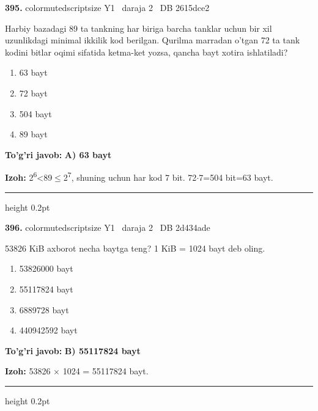 \documentclass[10pt,a4paper,oneside]{article}
\begin{document}
\noindent\textbf{\color{ink}395.}  {color{muted}scriptsize Y1 \textbullet\ daraja 2 \textbullet\ DB 2615dce2}
\par
Harbiy bazadagi 89 ta tankning har biriga barcha tanklar uchun bir xil uzunlikdagi minimal ikkilik kod berilgan. Qurilma marradan o'tgan 72 ta tank kodini bitlar oqimi sifatida ketma-ket yozsa, qancha bayt xotira ishlatiladi?
\begin{enumerate}[label=\Alph*),leftmargin=9mm]
\item 63 bayt
\item 72 bayt
\item 504 bayt
\item 89 bayt
\end{enumerate}
\begin{tcolorbox}[enhanced,breakable,colback=teal!4,colframe=teal!50!black,boxrule=0.5pt,arc=1.1mm,left=3mm,right=3mm,top=1.7mm,bottom=1.7mm,before skip=2mm,after skip=2mm]
\textbf{\color{teal}To'g'ri javob:} \textbf{A) 63 bayt}
\par\smallskip
\textbf{Izoh:} 2\textsuperscript{6}\textless{}89\ensuremath{\leq}2\textsuperscript{7}, shuning uchun har kod 7 bit. 72\ensuremath{\cdot}7=504 bit=63 bayt.
\end{tcolorbox}
\vspace{2mm}\hrule height 0.2pt \vspace{3mm}

\noindent\textbf{\color{ink}396.}  {color{muted}scriptsize Y1 \textbullet\ daraja 2 \textbullet\ DB 2d434ade}
\par
53826 KiB axborot necha baytga teng? 1 KiB = 1024 bayt deb oling.
\begin{enumerate}[label=\Alph*),leftmargin=9mm]
\item 53826000 bayt
\item 55117824 bayt
\item 6889728 bayt
\item 440942592 bayt
\end{enumerate}
\begin{tcolorbox}[enhanced,breakable,colback=teal!4,colframe=teal!50!black,boxrule=0.5pt,arc=1.1mm,left=3mm,right=3mm,top=1.7mm,bottom=1.7mm,before skip=2mm,after skip=2mm]
\textbf{\color{teal}To'g'ri javob:} \textbf{B) 55117824 bayt}
\par\smallskip
\textbf{Izoh:} 53826 \ensuremath{\times} 1024 = 55117824 bayt.
\end{tcolorbox}
\vspace{2mm}\hrule height 0.2pt \vspace{3mm}
\end{document}

